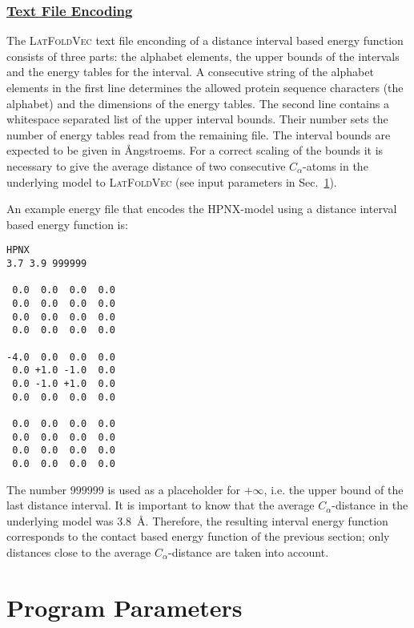 \documentclass{article}
\newcommand{\latFoldVec}{\textsc{LatFoldVec}}
\newenvironment{boxit}{\begin{lrbox}{\savepar}\begin{minipage}[t]{0.8\textwidth}}
                      {\end{minipage}\end{lrbox}\fbox{\usebox{\savepar}}}
\begin{document}
\subsubsection*{\underline{ Text File Encoding }}

The \latFoldVec{} text file enconding of a distance interval based energy function
consists of three parts: the alphabet elements, the upper bounds of the intervals
and the energy tables for the interval. A consecutive string of the alphabet
elements in the first line determines the allowed protein sequence characters
(the alphabet) and the dimensions of the energy tables. The second line
contains a whitespace separated list of the upper interval bounds. Their number
sets the number of energy tables read from the remaining file. The interval
bounds are expected to be given in {\AA}ngstroems. For a correct scaling of
the bounds it is necessary to give the average distance of two consecutive
$C_\alpha$-atoms in the underlying model to \latFoldVec{} (see input parameters in
Sec.~\ref{sec:parameter}).

An example energy file that encodes the HPNX-model using a distance interval
based energy function is:

\begin{center}
\begin{boxit}
\small
\begin{verbatim}
HPNX
3.7 3.9 999999

 0.0  0.0  0.0  0.0
 0.0  0.0  0.0  0.0
 0.0  0.0  0.0  0.0
 0.0  0.0  0.0  0.0

-4.0  0.0  0.0  0.0
 0.0 +1.0 -1.0  0.0
 0.0 -1.0 +1.0  0.0
 0.0  0.0  0.0  0.0

 0.0  0.0  0.0  0.0
 0.0  0.0  0.0  0.0
 0.0  0.0  0.0  0.0
 0.0  0.0  0.0  0.0
\end{verbatim}
\end{boxit}
\end{center}

The number $999999$ is used as a placeholder for $+\infty$, i.e. the upper bound
of the last distance interval. It is important to know that the average
$C_\alpha$-distance in the underlying model was 3.8~\AA. Therefore, the resulting
interval energy function corresponds to the contact based energy function of the
previous section; only distances close to the average $C_\alpha$-distance are
taken into account.


\section{Program Parameters}
\label{sec:parameter}
\end{document}
